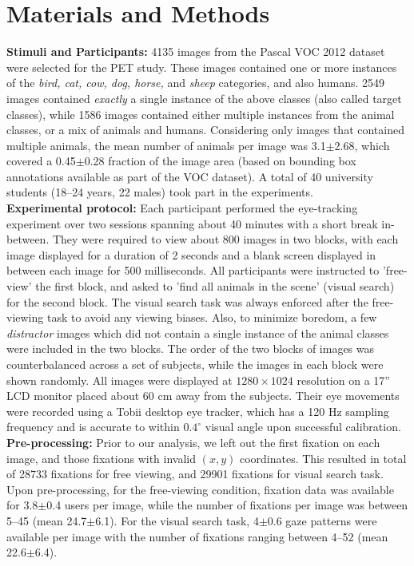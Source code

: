 \documentclass{article}
\begin{document}
\section{Materials and Methods}\label{EP}
\textbf{Stimuli and Participants:} 4135 images from the Pascal VOC 2012 dataset~\cite{pascalvoc2012} were selected for the PET study. These images contained one or more instances of the \textit{bird, cat, cow, dog, horse,} and \textit{sheep} categories, and also humans. 2549 images contained \textit{exactly} a single instance of the above classes (also called target classes), while 1586 images contained either multiple instances from the animal classes, or a mix of animals and humans. Considering only images that contained multiple animals, the mean number of animals per image was 3.1$\pm$2.68, which covered a 0.45$\pm$0.28 fraction of the image area (based on bounding box annotations available as part of the VOC dataset). A total of 40 university students (18--24 years, 22 males) took part in the experiments. \\

\textbf{Experimental protocol:} Each participant performed the eye-tracking experiment over two sessions spanning about 40 minutes with a short break in-between. They were required to view about 800 images in two blocks, with each image displayed for a duration of 2 seconds and a blank screen displayed in between each image for 500 milliseconds. All participants were instructed to 'free-view' the first block, and asked to 'find all animals in the scene' (visual search) for the second block. The visual search task was always enforced after the free-viewing task to avoid any viewing biases. Also, to minimize boredom, a few \textit{distractor} images which did not contain a single instance of the animal classes were included in the two blocks. The order of the two blocks of images was counterbalanced across a set of subjects, while the images in each block were shown randomly. All images were displayed at $1280\times1024$ resolution on a 17'' LCD monitor placed about 60 cm away from the subjects. Their eye movements were recorded using a Tobii desktop eye tracker, which has a 120 Hz sampling frequency and is accurate to within $0.4^\circ$ visual angle upon successful calibration. \\



\textbf{Pre-processing:} Prior to our analysis, we left out the first fixation on each image, and those fixations with invalid $(x,y)$ coordinates. This resulted in total of 28733 fixations for free viewing, and 29901 fixations for visual search task. Upon pre-processing, for the free-viewing condition, fixation data was available for 3.8$\pm$0.4 users per image, while the number of fixations per image was between 5--45 (mean 24.7$\pm$6.1). For the visual search task, 4$\pm$0.6 gaze patterns were available per image with the number of fixations ranging between 4--52 (mean 22.6$\pm$6.4).
\end{document}
